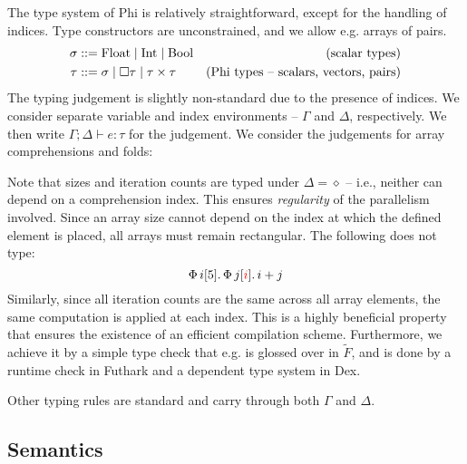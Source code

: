 The type system of Phi is relatively straightforward, except for the handling of indices. Type constructors are unconstrained, and we allow e.g. arrays of pairs. 
\begin{align*}
\mathrm{\sigma} &::= \phifloattype \mid \phiinttype \mid \phibooltype & \text{(scalar types)} \\
\tau &::= \mathrm{\sigma} \mid \phivectype{\tau} \mid \phipairtype{\tau}{\tau} & \text{(Phi types -- scalars, vectors, pairs)}
\end{align*}
The typing judgement is slightly non-standard due to the presence of indices. We consider separate variable and index environments -- $\Gamma$ and $\Delta$, respectively. We then write $\Gamma; \Delta \vdash e : \tau$ for the judgement. We consider the judgements for array comprehensions and folds:
\begin{center}
    \begin{prooftree}
    \end{prooftree} \quad
    \begin{prooftree}
    \end{prooftree}
\end{center}
Note that sizes and iteration counts are typed under $\Delta = \diamond$ -- i.e., neither can depend on a comprehension index. This ensures \textit{regularity} of the parallelism involved. Since an array size cannot depend on the index at which the defined element is placed, all arrays must remain rectangular. The following does not type:
$$ \phivec{i}{5}{\phivec{j}{\textcolor{red}{i}}{i + j}} $$
Similarly, since all iteration counts are the same across all array elements, the same computation is applied at each index. This is a highly beneficial property that ensures the existence of an efficient compilation scheme. Furthermore, we achieve it by a simple type check that e.g. is glossed over in $\tilde F$, and is done by a runtime check in Futhark and a dependent type system in Dex.

Other typing rules are standard and carry through both $\Gamma$ and $\Delta$.

\subsection{Semantics}

